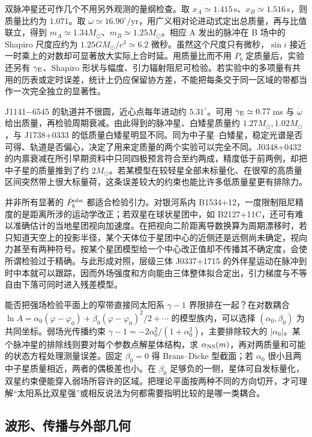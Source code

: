 双脉冲星还可作几个不用另外观测的量纲检查。取 $x_A\simeq1.415$\,s、$x_B\simeq1.516$\,s，则质量比约为 $1.071$。取 $\dot\omega\simeq16.90^\circ/\mathrm{yr}$，用广义相对论进动式定出总质量，再与比值联立，得到 $m_A\simeq1.34M_\odot$、$m_B\simeq1.25M_\odot$。相应 A 发出的脉冲在 B 场中的 Shapiro 尺度应约为 $1.25GM_\odot/c^3\simeq6.2$ 微秒。虽然这个尺度只有微秒，$\sin i$ 接近一时乘上的对数却可显著放大实际上合时延。用质量比而不用 $\dot P_b$ 定质量后，实验还另有 $\gamma_{\rm E}$、Shapiro 形状与幅度、引力辐射阻尼可检验。若实验中的多项量有共用的历表或定时误差，统计上仍应保留协方差，不能把每条交于同一区域的带都当作一次完全独立的显著性。

J1141$-$6545 的轨道并不很圆，近心点每年进动约 $5.31^\circ$。可用 $\gamma_{\rm E}\simeq0.77$\,ms 与 $\dot\omega$ 给出质量，再检验周期衰减。由此得到的脉冲星、白矮星质量约 $1.27M_\odot,1.02M_\odot$，与 J1738+0333 的低质量白矮星明显不同。同为中子星--白矮星，稳定光谱是否可得、轨道是否偏心，决定了用来定质量的两个实验可以完全不同。J0348+0432 的内禀衰减在所引早期资料中只同四极预言符合至约两成，精度低于前两例，却把中子星的质量推到了约 $2M_\odot$。若某模型在较轻星全部未标量化、在很窄的高质量区间突然带上很大标量荷，这条误差较大的约束也能比许多低质量星更有排除力。

并非所有显著的 $\dot P_b^{\rm obs}$ 都适合检验引力。对银河系内 B1534+12，一度限制阻尼精度的是距离所涉的运动学改正；若双星在球状星团中，如 B2127+11C，还可有难以准确估计的当地星团视向加速度。在把视向二阶距离导数换算为周期漂移时，若只知道天空上的投影半径，某个天体位于星团中心的近侧还是远侧尚未确定，视向力甚至有两种符号。按某个星团模型给一个中心改正值却不传播其不确定度，会使所谓检验过于精确。与此形成对照，层级三体 J0337+1715 的外伴星运动在脉冲到时中本就可以跟踪，因而外场强度和方向能由三体整体拟合定出，引力梯度与不等自由下落可同时进入残差模型。

能否把强场检验平面上的窄带直接同太阳系 $\gamma-1$ 界限排在一起？在对数耦合 $\ln A=\alpha_0(\varphi-\varphi_0)+\beta_0(\varphi-\varphi_0)^2/2+\cdots$ 的模型族内，可以选择 $(\alpha_0,\beta_0)$ 为共同坐标。弱场光传播约束 $\gamma-1=-2\alpha_0^2/(1+\alpha_0^2)$，主要排除较大的 $|\alpha_0|$。某个脉冲星的排除线则要对每个参数点解星体结构，求 $\alpha_{\rm NS}(m)$，再对两质量和可能的状态方程处理测量误差。固定 $\beta_0=0$ 得 Brans--Dicke 型截面；若 $\alpha_0$ 很小且两中子星质量相近，两者的偶极差也小。在 $\beta_0$ 足够负的一侧，星体可自发标量化，双星约束便能穿入弱场所容许的区域。把理论平面按两种不同的方向切开，才可理解“太阳系比双星强”或相反说法为何都需要指明比较的是哪一类耦合。

\subsection{波形、传播与外部几何}

